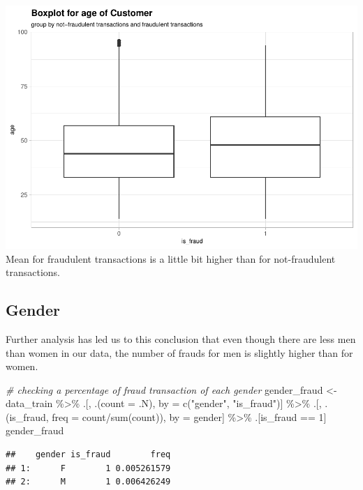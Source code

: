 \documentclass[
]{report}
\newenvironment{Shaded}{\begin{snugshade}}{\end{snugshade}}
\newcommand{\AttributeTok}[1]{\textcolor[rgb]{0.77,0.63,0.00}{#1}}
\newcommand{\CommentTok}[1]{\textcolor[rgb]{0.56,0.35,0.01}{\textit{#1}}}
\newcommand{\DecValTok}[1]{\textcolor[rgb]{0.00,0.00,0.81}{#1}}
\newcommand{\FunctionTok}[1]{\textcolor[rgb]{0.00,0.00,0.00}{#1}}
\newcommand{\NormalTok}[1]{#1}
\newcommand{\OtherTok}[1]{\textcolor[rgb]{0.56,0.35,0.01}{#1}}
\newcommand{\SpecialCharTok}[1]{\textcolor[rgb]{0.00,0.00,0.00}{#1}}
\newcommand{\StringTok}[1]{\textcolor[rgb]{0.31,0.60,0.02}{#1}}
\begin{document}
\includegraphics{credit_card_fraud_detection_files/figure-latex/age_plot-1.pdf}
Mean for fraudulent transactions is a little bit higher than for
not-fraudulent transactions.

\hypertarget{gender}{%
\subsection{Gender}\label{gender}}

Further analysis has led us to this conclusion that even though there
are less men than women in our data, the number of frauds for men is
slightly higher than for women.

\begin{Shaded}
\begin{Highlighting}[]
\CommentTok{\# checking a percentage of fraud transaction of each gender}
\NormalTok{gender\_fraud }\OtherTok{\textless{}{-}}\NormalTok{ data\_train }\SpecialCharTok{\%\textgreater{}\%} 
\NormalTok{  .[, .(}\AttributeTok{count =}\NormalTok{ .N), by }\OtherTok{=} \FunctionTok{c}\NormalTok{(}\StringTok{"gender"}\NormalTok{, }\StringTok{"is\_fraud"}\NormalTok{)] }\SpecialCharTok{\%\textgreater{}\%}
\NormalTok{  .[, .(is\_fraud, }\AttributeTok{freq =}\NormalTok{ count}\SpecialCharTok{/}\FunctionTok{sum}\NormalTok{(count)), by }\OtherTok{=}\NormalTok{ gender] }\SpecialCharTok{\%\textgreater{}\%}
\NormalTok{  .[is\_fraud }\SpecialCharTok{==} \DecValTok{1}\NormalTok{]}
\NormalTok{gender\_fraud}
\end{Highlighting}
\end{Shaded}

\begin{verbatim}
##    gender is_fraud        freq
## 1:      F        1 0.005261579
## 2:      M        1 0.006426249
\end{verbatim}
\end{document}
